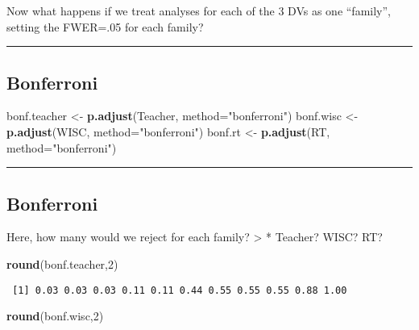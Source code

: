 \documentclass[]{article}
\newenvironment{Shaded}{\begin{snugshade}}{\end{snugshade}}
\newcommand{\DataTypeTok}[1]{\textcolor[rgb]{0.13,0.29,0.53}{#1}}
\newcommand{\DecValTok}[1]{\textcolor[rgb]{0.00,0.00,0.81}{#1}}
\newcommand{\KeywordTok}[1]{\textcolor[rgb]{0.13,0.29,0.53}{\textbf{#1}}}
\newcommand{\NormalTok}[1]{#1}
\newcommand{\StringTok}[1]{\textcolor[rgb]{0.31,0.60,0.02}{#1}}
\begin{document}
Now what happens if we treat analyses for each of the 3 DVs as one
``family'', setting the FWER=.05 for each family?

\begin{center}\rule{0.5\linewidth}{\linethickness}\end{center}

\hypertarget{bonferroni}{%
\subsection{Bonferroni}\label{bonferroni}}

\begin{Shaded}
\begin{Highlighting}[]
\NormalTok{bonf.teacher <-}\StringTok{ }\KeywordTok{p.adjust}\NormalTok{(Teacher, }\DataTypeTok{method=}\StringTok{"bonferroni"}\NormalTok{)}
\NormalTok{bonf.wisc <-}\StringTok{ }\KeywordTok{p.adjust}\NormalTok{(WISC, }\DataTypeTok{method=}\StringTok{"bonferroni"}\NormalTok{)}
\NormalTok{bonf.rt <-}\StringTok{ }\KeywordTok{p.adjust}\NormalTok{(RT, }\DataTypeTok{method=}\StringTok{"bonferroni"}\NormalTok{)}
\end{Highlighting}
\end{Shaded}

\begin{center}\rule{0.5\linewidth}{\linethickness}\end{center}

\hypertarget{bonferroni-1}{%
\subsection{Bonferroni}\label{bonferroni-1}}

Here, how many would we reject for each family? \textgreater{} *
Teacher? WISC? RT?

\begin{Shaded}
\begin{Highlighting}[]
\KeywordTok{round}\NormalTok{(bonf.teacher,}\DecValTok{2}\NormalTok{)}
\end{Highlighting}
\end{Shaded}

\begin{verbatim}
 [1] 0.03 0.03 0.03 0.11 0.11 0.44 0.55 0.55 0.55 0.88 1.00
\end{verbatim}

\begin{Shaded}
\begin{Highlighting}[]
\KeywordTok{round}\NormalTok{(bonf.wisc,}\DecValTok{2}\NormalTok{)}
\end{Highlighting}
\end{Shaded}
\end{document}
